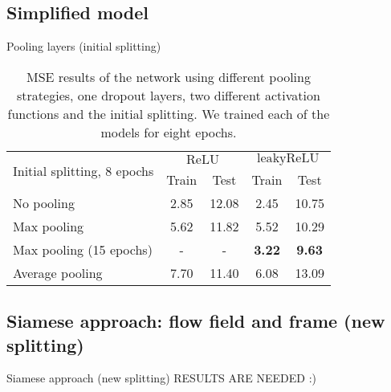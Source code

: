 \subsection{Simplified model}
\begin{frame}{Pooling layers (initial splitting)}
\begin{table}[!t]
\normalsize
\centering
\begin{tabular}{lcccc}
\toprule
\multirow{2}{*}{Initial splitting, 8 epochs}  & \multicolumn{2}{c}{$\mathrm{ReLU}$} & \multicolumn{2}{c}{$\mathrm{leakyReLU}$} \\
 & Train & Test & Train & Test\\
\midrule
No pooling & 2.85 & 12.08 & 2.45 & 10.75 \\
Max pooling & 5.62 & 11.82 & 5.52 & 10.29 \\
Max pooling (15 epochs) & - & - & \textbf{3.22} & \textbf{9.63} \\
Average pooling & 7.70 & 11.40 & 6.08 & 13.09\\
\bottomrule
\end{tabular}
\caption{MSE results of the network using different pooling strategies, one dropout layers, two different activation functions and 
the initial splitting. We trained each of the models for eight epochs.}
\end{table}
\end{frame}
\subsection{Siamese approach: flow field and frame (new splitting)}
\begin{frame}{Siamese approach (new splitting)}
RESULTS ARE NEEDED :)
\end{frame}
